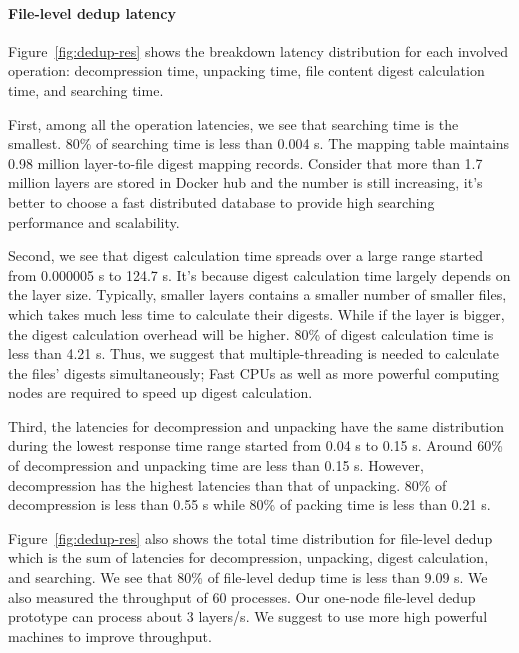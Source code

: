 \paragraph{File-level dedup latency}

%
Figure~\ref{fig:dedup-res} shows the breakdown latency distribution for each involved operation: decompression time, unpacking time, file content digest calculation time, and searching time.

First, among all the operation latencies, we see that searching time is the smallest. 80\% of searching time is less than 0.004 s. The mapping table maintains 0.98 million layer-to-file digest mapping records. Consider that more than 1.7 million layers are stored in Docker hub and the number is still increasing, it's better to choose a fast distributed database to provide high searching performance and scalability.
  
Second, we see that digest calculation time spreads over a large range started from 0.000005 s to 124.7 s. It's because digest calculation time largely depends on the layer size. Typically, smaller layers contains a smaller number of smaller files, which takes much less time to calculate their digests. While if the layer is bigger, the digest calculation overhead will be higher. 80\% of digest calculation time is less than 4.21 s. 
Thus, we suggest that multiple-threading is needed to calculate the files' digests simultaneously; Fast CPUs as well as more powerful computing nodes are required to speed up digest calculation.

Third, the latencies for decompression and unpacking have the same distribution during the lowest response time range started from 0.04 s to 0.15 s. Around 60\% of decompression and unpacking time are less than 0.15 s. However, decompression has the highest latencies than that of unpacking. 80\% of decompression is less than 0.55 s while 80\% of packing time is less than 0.21 s. 

Figure~\ref{fig:dedup-res} also shows the total time distribution for file-level dedup which is the sum of latencies for decompression, unpacking, digest calculation, and searching. We see that 80\% of file-level dedup time is less than 9.09 s. We also measured the throughput of 60 processes. Our one-node file-level dedup prototype can process about 3 layers/s. We suggest to use more high powerful machines to improve throughput.

